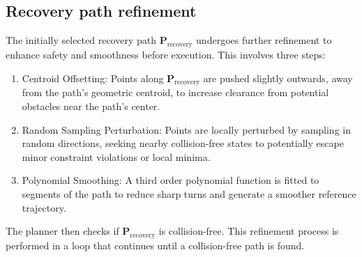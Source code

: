 \subsection{Recovery path refinement}
The initially selected recovery path \( \mathbf{P}_{\text{recovery}} \) undergoes further refinement to enhance safety and smoothness before execution. This involves three steps:
\begin{enumerate}
    \item Centroid Offsetting: Points along \( \mathbf{P}_{\text{recovery}} \) are pushed slightly outwards, away from the path's geometric centroid, to increase clearance from potential obstacles near the path's center.
    \item Random Sampling Perturbation: Points are locally perturbed by sampling in random directions, seeking nearby collision-free states to potentially escape minor constraint violations or local minima.
    \item Polynomial Smoothing: A third order polynomial function is fitted to segments of the path to reduce sharp turns and generate a smoother reference trajectory.
\end{enumerate}
The planner then checks if \( \mathbf{P}_{\text{recovery}} \) is collision-free. This refinement process is performed in a loop that continues until a collision-free path is found.




























